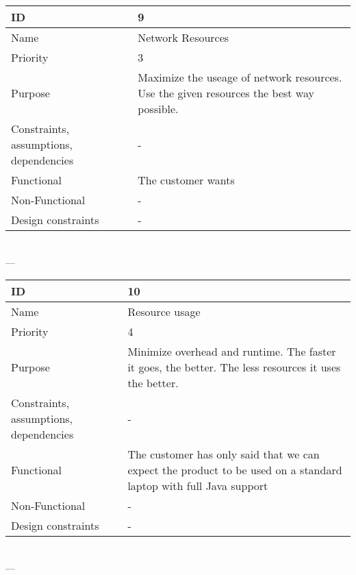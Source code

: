 \begin{center}
    \begin{tabular}{| p{4cm} | p{8cm} |}
        \hline
        ID & 9 \\
        \hline
        Name & Network Resources \\
        \hline
        Priority & 3 \\
        \hline
        Purpose & Maximize the useage of network resources. Use the given resources the best way possible. \\
        \hline 
        Constraints, assumptions, dependencies & -\\
        \hline  
        Functional & The customer wants \\
        \hline
        Non-Functional & -\\ 
        \hline
        Design constraints & -\\
        \hline
    \end{tabular}
    \\  ---  \\
    
    \begin{tabular}{| p{4cm} | p{8cm} |}
        \hline
        ID & 10 \\
        \hline
        Name & Resource usage  \\
        \hline
        Priority & 4 \\
        \hline
        Purpose & Minimize overhead and runtime. The faster it goes, the better. The less resources it uses the better. \\
        \hline 
        Constraints, assumptions, dependencies & -\\
        \hline  
        Functional & The customer has only said that we can expect the product to be used on a standard laptop with full Java support\\
        \hline
        Non-Functional & -\\ 
        \hline
        Design constraints & -\\
        \hline
    \end{tabular}
    \\  ---  \\
\end{center}
